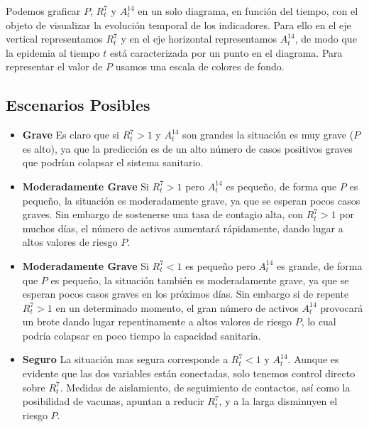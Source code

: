 \documentclass[12pt,a4paper]{article}
\begin{document}
Podemos graficar $P$,  $R^7_t$ y $A^{14}_t$ en un solo diagrama, en función del tiempo, 
con el objeto de visualizar la evolución temporal de los indicadores. 
Para ello en el eje vertical representamos $R^7_t$ y en el eje horizontal 
representamos $A^{14}_t$, de modo que la epidemia al tiempo $t$ está caracterizada 
por un punto en el diagrama. Para representar el valor de 
$P$ usamos una escala de colores de fondo. 

\subsection*{Escenarios Posibles}

\begin{itemize}
\item {\bf Grave} Es claro que si $R^7_t>1$ y $A^{14}_t$ son grandes 
la situación es muy grave ($P$ es alto), ya que la predicción es de un alto número 
de casos positivos graves que podrían colapsar el sistema sanitario.

\item {\bf Moderadamente Grave} Si $R^7_t>1$ pero 
$A^{14}_t$ es pequeño, de forma que $P$ es pequeño, 
la situación es moderadamente grave, ya que se esperan 
pocos casos graves. Sin embargo de sostenerse una tasa de contagio alta, 
con $R^7_t>1$ por muchos días, el n\'umero de
activos aumentará rápidamente, dando lugar a altos valores 
de riesgo $P$. 

\item {\bf Moderadamente Grave} Si $R^7_t<1$ es pequeño pero 
$A^{14}_t$ es grande, de forma que $P$ es pequeño, la situación 
también es moderadamente grave, ya que se esperan 
pocos casos graves en los próximos días. 
Sin embargo si de repente $R^7_t>1$ en un determinado momento, el gran número de activos 
$A^{14}_t$ provocará un brote dando lugar repentinamente 
a altos valores de riesgo $P$, lo cual podría colapsar en poco tiempo 
la capacidad sanitaria.

\item {\bf Seguro}  La situación mas segura corresponde a 
$R^7_t<1$ y $A^{14}_t$. Aunque es evidente que las dos 
variables están conectadas, solo tenemos control 
directo sobre $R^7_t$. Medidas de aislamiento, 
de seguimiento de contactos, así como la posibilidad de vacunas, 
apuntan a reducir $R^7_t$, y a la larga disminuyen el riesgo $P$. 
\end{itemize}
\end{document}
